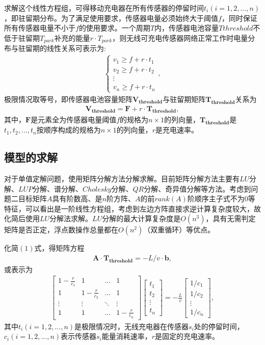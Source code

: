 \documentclass{whutmod}
\begin{document}
			求解这个线性方程组，可得移动充电器在所有传感器的停留时间$t_i(i=1,2,...,n)$，即驻留期分布。为了满足使用要求，传感器电量必须始终大于阈值$f$，同时保证所有传感器电量不小于$f$的使用要求。一个周期$T$内，传感器电池容量$T{threshold}$不低于驻留期$T_{park}$补充的能量$r \cdot T_{park}$，则无线可充电传感器网络正常工作时电量分布与驻留期的线性关系可表示为:
			\begin{gather}
			\left\{\begin{matrix}
			v_1\geq f+r\cdot t_1\\ 
			v_2\geq f+r\cdot t_2\\ 
			\vdots \\ 
			v_n \geq f+r\cdot t_n
			\end{matrix}\right.,
			\end{gather}
			极限情况取等号，即传感器电池容量矩阵$\bm {V_{threshold}}$与驻留期矩阵$\bm {T_{threshold}}$关系为
			\begin{gather}
			\bm{V_{threshold}}=\bm{F}+r\cdot \bm{T_{threshold}},
			\end{gather}
			其中，$\bm F$是元素全为传感器电量阈值$f$的规格为$n \times 1$的列向量，$\bm{T_{threshold}}$是$t_1,t_2,...,t_{n}$按顺序构成的规格为$n\times 1$的列向量，$r$是充电速率。
    		
		
		\subsection{模型的求解}
		对于单值定解问题，使用矩阵分解方法分解求解。目前矩阵分解方法主要有$LU$分解、$LUP$分解、谱分解、$Cholesky$分解、$QR$分解、奇异值分解等方法。考虑到问题二目标矩阵$A$具有阶数高、是$n$阶方阵、$A$的前$rank(A)$阶顺序主子式不为$0$等特征，可以看出是一阶线性方程组，考虑到左边方阵直接求逆计算复杂度较大，故化简后使用$LU$分解法求解。$LU$分解的最大计算复杂度是$O(n^3)$，具有无需判定矩阵是否正定，浮点数操作总量都在$O(n^2)$（双重循环）等优点。
		
		化简$(1)$式，得矩阵方程
		\begin{gather}
		\bm A \cdot \bm{T_{threshold}}=-L/v \cdot \bm b,
		\end{gather}
		或表示为
		\begin{gather}
		\begin{bmatrix}
		1-\frac{r}{c_1} & 1 & ... & 1 \\ 
		1 & 1-\frac{r}{c_2} & ... & 1\\ 
		\vdots  & \vdots & \ddots  & \vdots \\ 
		1 & 1 & ... & 1-\frac{r}{c_n}
		\end{bmatrix}\begin{bmatrix}
		t_1\\ t_2\\ \vdots\\ t_n
		\end{bmatrix}=-\frac{L}{v}
		\begin{bmatrix}
		1/c_1\\ 1/c_2\\ \vdots\\ 1/c_n
		\end{bmatrix},
		\end{gather}
		其中$t_i(i=1,2,...,n)$是极限情况时，无线充电器在传感器$s_i$处的停留时间，$c_i(i=1,2,...,n)$表示传感器$s_i$能量消耗速率，$r$是固定的充电速率。
		
\end{document}
